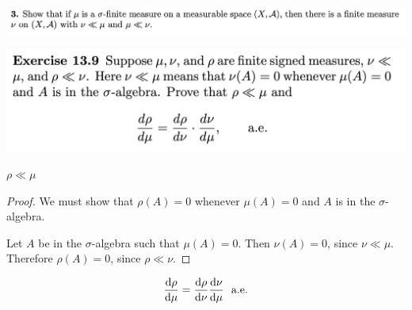 \begin{mdframed}
\includegraphics[width=400pt]{img/analysis--berkeley-202a-hw11-3704.png}
\end{mdframed}


\begin{mdframed}
\includegraphics[width=400pt]{img/analysis--berkeley-202a-hw11-f2c0.png}
\end{mdframed}


\begin{claim*}
  $\rho \ll \mu$
\end{claim*}
\begin{proof}
  We must show that $\rho(A) = 0$ whenever $\mu(A) = 0$ and $A$ is in the $\sigma$-algebra.

  Let $A$ be in the $\sigma$-algebra such that $\mu(A) = 0$. Then $\nu(A) = 0$, since $\nu \ll \mu$.
  Therefore $\rho(A) = 0$, since $\rho \ll \nu$.
\end{proof}

\begin{claim*}
  \begin{align*}
    \frac{\d\rho}{\d\mu} = \frac{\d\rho}{\d\nu}\frac{\d\nu}{\d\mu} \ae
  \end{align*}
\end{claim*}

